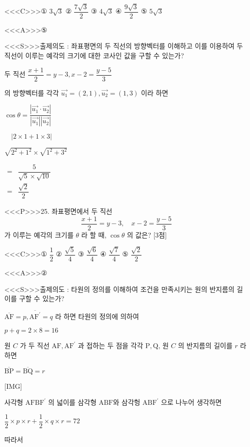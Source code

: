 \documentclass{oblivoir}
\begin{document}
<<<C>>>① $3 \sqrt{3}$
② $\dfrac{7 \sqrt{3}}{2}$
③ $4 \sqrt{3}$
④ $\dfrac{9 \sqrt{3}}{2}$
⑤ $5 \sqrt{3}$


<<<A>>>⑤

<<<S>>>출제의도 : 좌표평면의 두 직선의 방향벡터를 이해하고 이를 이용하여 두 직선이 이루는 예각의 크기에 대한 코사인 값을 구할 수 있는가?

두 직선
$\dfrac{x+1}{2}=y-3, x-2=\dfrac{y-5}{3}$

의 방향벡터를 각각
$\overrightarrow{u_{1}}=(2,1), \overrightarrow{u_{2}}=(1,3)$
이라 하면

$\cos \theta=\dfrac{\left|\overrightarrow{u_{1}} \cdot \overrightarrow{u_{2}}\right|}{\left|\overrightarrow{u_{1}}\right|\left|\overrightarrow{u_{2}}\right|}$

$\quad|2 \times 1+1 \times 3|$

$\sqrt{2^{2}+1^{2}} \times \sqrt{1^{2}+3^{2}}$

$\begin{aligned}=& \dfrac{5}{\sqrt{5} \times \sqrt{10}} \\=& \dfrac{\sqrt{2}}{2} \end{aligned}$



<<<P>>>25. 좌표평면에서 두 직선
$$
\dfrac{x+1}{2}=y-3, \quad x-2=\dfrac{y-5}{3}
$$
가 이루는 예각의 크기를 $\theta$ 라 할 때, $\cos \theta$ 의 값은? [3점]

<<<C>>>① $\dfrac{1}{2}$
② $\dfrac{\sqrt{5}}{4}$
③ $\dfrac{\sqrt{6}}{4}$
④ $\dfrac{\sqrt{7}}{4}$
⑤ $\dfrac{\sqrt{2}}{2}$


<<<A>>>②

<<<S>>>출제의도 : 타원의 정의를 이해하여 조건을 만족시키는 원의 반지름의 길이를 구할 수 있는가?

$\overline{\mathrm{AF}}=p, \overline{\mathrm{AF}^{\prime}}=q$ 라 하면 타원의 정의에
의하여

$p+q=2 \times 8=16$

원 $C$ 가 두 직선 $\mathrm{AF}, \mathrm{AF}^{\prime}$ 과 접하는 두 점을 각각 $\mathrm{P}, \mathrm{Q}$, 원 $C$ 의 반지름의 길이를 $r$ 라 하면

$\overline{\mathrm{BP}}=\overline{\mathrm{BQ}}=r$

[IMG]

사각형 $\mathrm{AFBF}^{\prime}$ 의 넓이를 삼각형 $\mathrm{ABF}$와 삼각헝 $\mathrm{ABF}^{\prime}$ 으로 나누어 생각하면

$\dfrac{1}{2} \times p \times r+\dfrac{1}{2} \times q \times r=72$

따라서
\end{document}
